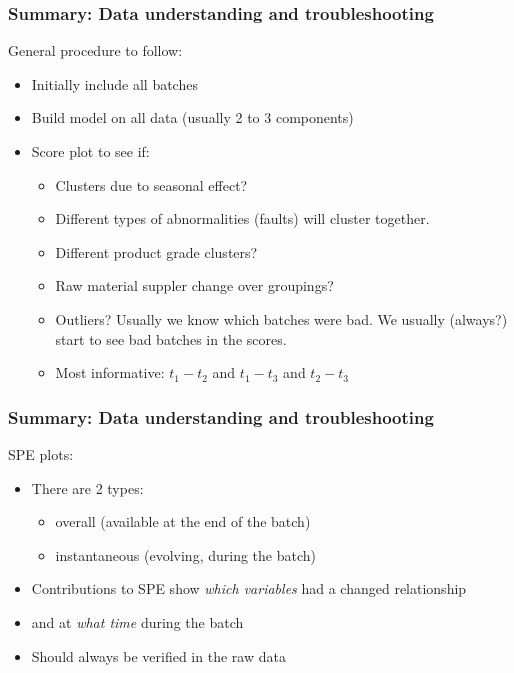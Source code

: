 
\begin{frame}\frametitle{Summary: Data understanding and troubleshooting}
	
General procedure to follow:	

\begin{itemize}
	\item	Initially include all batches
	
	\item	Build model on all data (usually 2 to 3 components)
	
	\item	Score plot to see if: \hfill {}
	
			\begin{itemize}
				\item	Clusters due to seasonal effect?
				
				\item	Different types of abnormalities (faults) will cluster together.
				
				\item	Different product grade clusters?
				
				\item	Raw material suppler change over groupings?
				
				\item	Outliers? Usually we know which batches were bad.  We usually (always?) start to see bad batches in the scores.
				
				\item	Most informative: \( t_1 - t_2 \) and \( t_1 - t_3 \) and \( t_2 - t_3 \)
			\end{itemize}
\end{itemize}

\end{frame}

\begin{frame}\frametitle{Summary: Data understanding and troubleshooting}
	
SPE plots:

\begin{itemize}
	\item	There are 2 types:
	
			\begin{itemize}
				\item	overall (available at the end of the batch)
				
				\item	instantaneous (evolving, during the batch)
			\end{itemize}
			
	\item	Contributions to SPE show \emph{which variables} had a changed relationship
	
	\item	and at \emph{what time} during the batch
	
	\item	Should always be verified in the raw data
\end{itemize}

\end{frame}

